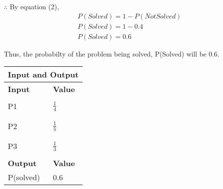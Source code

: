 \documentclass[journal,12pt,twocolumn]{IEEEtran}
\begin{document}
\noindent $\therefore$ By equation (2), 
\begin {align}
  &P(Solved) = 1-P(NotSolved)\\
  &P(Solved) = 1-0.4\\
  &P(Solved) = 0.6
\end{align}

Thus, the probabilty of the problem being solved, P(Solved) will be 0.6.\\

\begin{tabular}{ ||p{3.5cm}|p{2cm}||  }
 \hline
 \hline
 \multicolumn{2}{||c||}{\textbf{Input and Output}} \\
 \hline
 \hline
 \textbf{Input}& \textbf{Value} \\
 \hline
 &\\
 P1 &   \(\frac{1}{4}\)\\
 &\\
 \hline
 &\\
 P2 &   \(\frac{1}{5}\)\\
 &\\
 \hline
 &\\
 P3 &   \(\frac{1}{3}\)\\
 &\\
 \hline
 \textbf{Output}& \textbf{Value} \\
 \hline
 P(solved)&   0.6 \\
 \hline
 \hline
\end{tabular}
\end{document}
